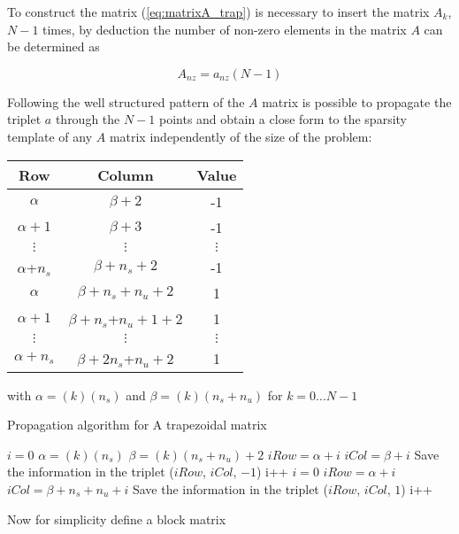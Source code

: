 \documentclass[12pt]{article}
\begin{document}
To construct the matrix (\ref{eq:matrixA_trap}) is necessary to insert the matrix $A_k$, $N-1$ times, by deduction the number of non-zero elements in the matrix $A$ can be determined as

\begin{equation}
    A_{nz}=a_{nz}(N-1)
\end{equation}

Following the well structured pattern of the $A$ matrix is possible to propagate the triplet $a$ through the $N-1$ points and obtain a close form to the sparsity template of any $A$ matrix independently of the size of the problem:

\begin{table}[h]
\begin{center}
\begin{tabular}{c|c|c}
Row    & Column        & Value \\ \hline
$\alpha$      & $\beta+2$             & -1    \\
$\alpha+1$    & $\beta+3$           & -1    \\
$\vdots$ & $\vdots$   &    $\vdots$     \\
$\alpha$+$n_s$ & $\beta+n_s+2$        & -1    \\
$\alpha$      & $\beta+n_s+n_u+2$  & 1     \\
$\alpha+1$    & $\beta+n_s$+$n_u+1 +2$ & 1     \\
 $\vdots$ & $\vdots$     &    $\vdots$     \\
$\alpha+n_s$ & $\beta+2n_s$+$n_u+2$  & 1    
\end{tabular}
\end{center}
\end{table}

\noindent with $\alpha=(k)(n_s)$ and $\beta=(k)(n_s+n_u)$ for $k=0...N-1$
%
\begin{algorithm}
	\caption{Propagation algorithm for A trapezoidal matrix} 
	\begin{algorithmic}[1]
		    \State $i=0$
		    \State $\alpha=(k)(n_s)$
		    \State $\beta=(k)(n_s+n_u)+2$
			    \State $iRow=\alpha+i$
			    \State $iCol=\beta+i$
				\State Save the information in the triplet ($iRow$, $iCol$, $-1$)
				\State i++
			\EndFor
			\State $i=0$
			    \State $iRow=\alpha+i$
			    \State $iCol=\beta+n_s+n_u+i$
				\State Save the information in the triplet ($iRow$, $iCol$, $1$)
				\State i++
			\EndFor
		\EndFor
	\end{algorithmic} 
\end{algorithm}
%
\newpage
\noindent Now for simplicity define a block matrix
\end{document}

